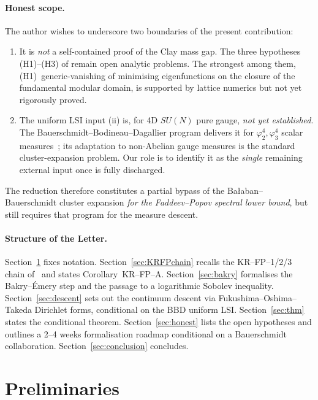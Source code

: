 \documentclass[11pt,a4paper]{amsart}
\theoremstyle{definition}
\begin{document}
\paragraph{Honest scope.} The author wishes to underscore two boundaries of
the present contribution:
\begin{enumerate}[label=(\alph*),leftmargin=2em]
\item It is \emph{not} a self-contained proof of the Clay mass gap. The
three hypotheses (H1)--(H3) of \cite{RemondiereKRFP3_2026} remain open
analytic problems. The strongest among them, (H1)~generic-vanishing of
minimising eigenfunctions on the closure of the fundamental modular domain,
is supported by lattice numerics but not yet rigorously proved.
\item The uniform LSI input (ii) is, for 4D $SU(N)$ pure gauge,
\emph{not yet established}. The Bauerschmidt--Bodineau--Dagallier program
delivers it for $\varphi^4_2,\varphi^4_3$ scalar
measures~\cite{BauerschmidtDagallier2024}; its adaptation to non-Abelian
gauge measures is the standard cluster-expansion problem. Our role is
to identify it as the \emph{single} remaining external input once
\cite{RemondiereKRFP3_2026} is fully discharged.
\end{enumerate}
The reduction therefore constitutes a partial bypass of the
Ba\l aban--Bauerschmidt cluster expansion \emph{for the Faddeev--Popov
spectral lower bound}, but still requires that program for the measure
descent.

\paragraph{Structure of the Letter.} Section~\ref{sec:prelim} fixes
notation. Section~\ref{sec:KRFPchain} recalls the KR--FP--1/2/3 chain
of~\cite{RemondiereKRFP3_2026} and states Corollary~KR--FP--A.
Section~\ref{sec:bakry} formalises the Bakry--\'Emery step and the passage
to a logarithmic Sobolev inequality. Section~\ref{sec:descent} sets out
the continuum descent via Fukushima--Oshima--Takeda Dirichlet forms,
conditional on the BBD uniform LSI. Section~\ref{sec:thm} states the
conditional theorem. Section~\ref{sec:honest} lists the open hypotheses
and outlines a 2--4 weeks formalisation roadmap conditional on a Bauerschmidt
collaboration. Section~\ref{sec:conclusion} concludes.

\section{Preliminaries}\label{sec:prelim}
\end{document}
